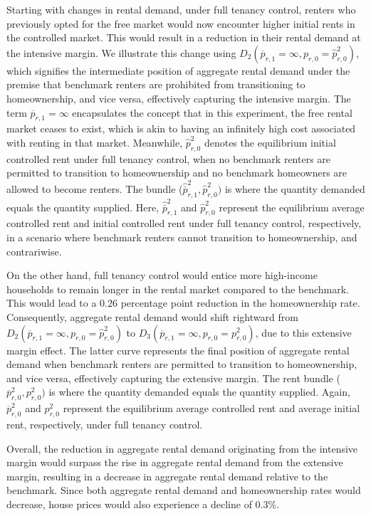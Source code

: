 \documentclass[parskip=full]{article}
\begin{document}
Starting with changes in rental demand, under full tenancy control, renters who previously opted for the free market would now encounter higher initial rents in the controlled market. This would result in a reduction in their rental demand at the intensive margin. We illustrate this change using $D_{2}(\overline{p}_{r,1}=\infty,p_{r,0}=\hat{p}^{2}_{r,0})$, which signifies the intermediate position of aggregate rental demand under the premise that benchmark renters are prohibited from transitioning to homeownership, and vice versa, effectively capturing the intensive margin. The term $\overline{p}_{r,1}=\infty$ encapsulates the concept that in this experiment, the free rental market ceases to exist, which is akin to having an infinitely high cost associated with renting in that market. Meanwhile, $\hat{p}^{2}_{r,0}$ denotes the equilibrium initial controlled rent under full tenancy control, when no benchmark renters are permitted to transition to homeownership and no benchmark homeowners are allowed to become renters. The bundle ($\hat{\bar{p}}^{2}_{r,1},\hat{p}^{2}_{r,0})$ is where the quantity demanded equals the quantity supplied. Here, $\hat{\bar{p}}^{2}_{r,1}$ and $\hat{p}^{2}_{r,0}$ represent the equilibrium average controlled rent and initial controlled rent under full tenancy control, respectively, in a scenario where benchmark renters cannot transition to homeownership, and contrariwise.

On the other hand, full tenancy control would entice more high-income households to remain longer in the rental market compared to the benchmark. This would lead to a 0.26 percentage point reduction in the homeownership rate. Consequently, aggregate rental demand would shift rightward from $D_{2}(\overline{p}_{r,1}=\infty,p_{r,0}=\hat{p}^{2}_{r,0})$ to $D_{3}(\overline{p}_{r,1}=\infty,p_{r,0}=p^{2}_{r,0})$, due to this extensive margin effect. The latter curve represents the final position of aggregate rental demand when benchmark renters are permitted to transition to homeownership, and vice versa, effectively capturing the extensive margin. The rent bundle ($\overline{p}^{2}_{r,0},p^{2}_{r,0})$ is where the quantity demanded equals the quantity supplied. Again, $\overline{p}^{2}_{r,0}$ and $p^{2}_{r,0}$ represent the equilibrium average controlled rent and average initial rent, respectively, under full tenancy control.

Overall, the reduction in aggregate rental demand originating from the intensive margin would surpass the rise in aggregate rental demand from the extensive margin, resulting in a decrease in aggregate rental demand relative to the benchmark. Since both aggregate rental demand and homeownership rates would decrease, house prices would also experience a decline of 0.3\%.
\end{document}
